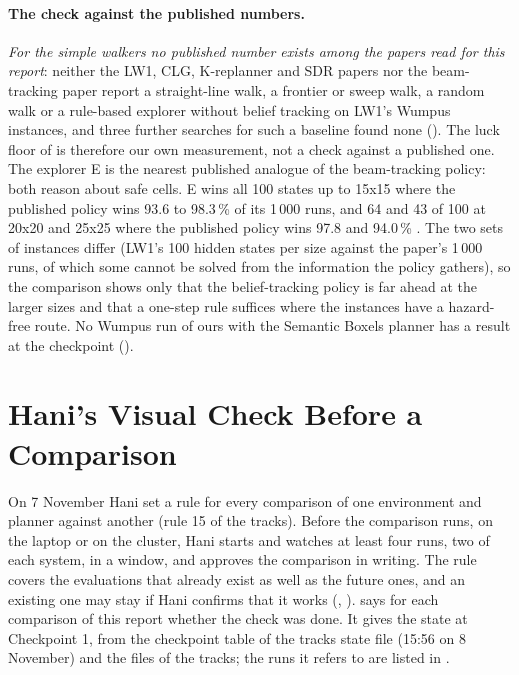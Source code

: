 \paragraph{The check against the published numbers.} \emph{For the simple walkers
no published number exists among the papers read for this report}: neither the LW1,
CLG, K-replanner and SDR papers nor the beam-tracking paper report a straight-line
walk, a frontier or sweep walk, a random walk or a rule-based explorer without
belief tracking on LW1's Wumpus instances, and three further searches for such a
baseline found none (). The luck floor of
 is therefore our own measurement, not a check against a
published one. The explorer E is the nearest published analogue of the beam-tracking
policy: both reason about safe cells. E wins all 100 states up
to 15x15 where the published policy wins 93.6 to 98.3\,\% of its 1\,000 runs, and 64
and 43 of 100 at 20x20 and 25x25 where the published policy wins 97.8 and
94.0\,\% \cite{bonet2013causal}. The two sets of instances differ (LW1's 100 hidden
states per size against the paper's 1\,000 runs, of which some cannot be solved
from the information the policy gathers), so the comparison shows only that the
belief-tracking policy is far ahead at the larger sizes and that a one-step rule
suffices where the instances have a hazard-free route. No Wumpus run of ours with
the Semantic Boxels planner has a result at the checkpoint ().

\section{Hani's Visual Check Before a Comparison}
\label{sec:visual-check}

On 7 November Hani set a rule for every comparison of one environment and planner
against another (rule 15 of the tracks). Before the comparison runs, on the laptop or
on the cluster, Hani starts and watches at least four runs, two of each system, in a
window, and approves the comparison in writing. The rule covers the evaluations
that already exist as well as the future ones, and an existing one may stay if Hani
confirms that it works (, ).
 says for each comparison of this report whether the check was
done. It gives the state at Checkpoint 1, from the checkpoint table of the tracks state
file (15:56 on 8 November) and the files of the tracks; the runs it refers to are listed
in .


